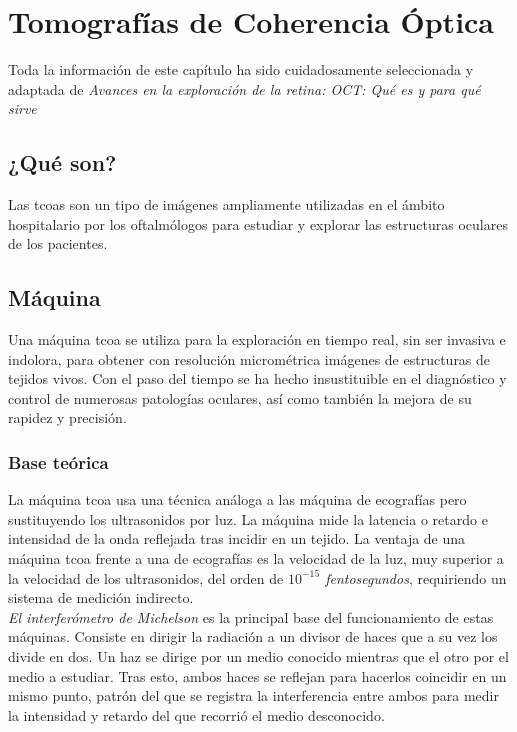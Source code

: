 \chapter{Tomografías de Coherencia Óptica}
Toda la información de este capítulo ha sido cuidadosamente
seleccionada y adaptada de \emph{Avances en la exploración de la
  retina: OCT: Qué es y para qué sirve}\cite{oct-bib}
\section{¿Qué son?}
Las \glspl{tcoa} son un tipo de imágenes ampliamente utilizadas en el
ámbito hospitalario por los oftalmólogos para estudiar y explorar las
estructuras oculares de los pacientes.

\section{Máquina }
Una máquina \gls{tcoa} se utiliza para la exploración en tiempo real, sin ser
invasiva e indolora, para obtener con resolución micrométrica imágenes
de estructuras de tejidos vivos. Con el paso del tiempo se ha hecho
insustituible en el diagnóstico y control de numerosas patologías
oculares, así como también la mejora de su rapidez y precisión.

\subsection{Base teórica}
La máquina \gls{tcoa} usa una técnica análoga a las máquina de ecografías
pero sustituyendo los ultrasonidos por luz. La máquina mide la
latencia o retardo e intensidad de la onda reflejada tras incidir en
un tejido. La ventaja de una máquina \gls{tcoa} frente a una de ecografías es
la velocidad de la luz, muy superior a la velocidad de los
ultrasonidos, del orden de \emph{$10^{-15}$ fentosegundos}, requiriendo un sistema de medición indirecto.\\
\emph{El interferómetro de Michelson} es la principal base del funcionamiento de
estas máquinas. Consiste en dirigir la radiación a un divisor de haces
que a su vez los divide en dos. Un haz se dirige por un medio conocido
mientras que el otro por el medio a estudiar. Tras esto, ambos haces
se reflejan para hacerlos coincidir en un mismo punto, patrón del que
se registra la interferencia entre ambos para medir la intensidad y
retardo del que recorrió el medio desconocido.




